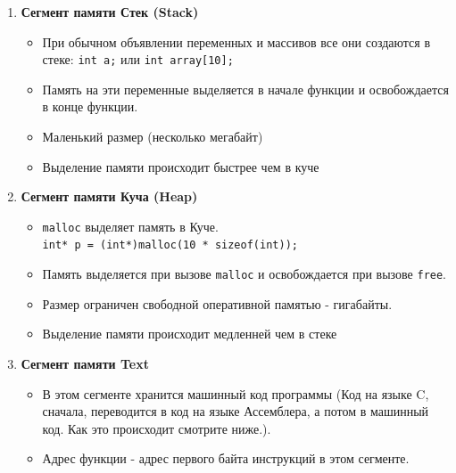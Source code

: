 \documentclass{article}
\begin{document}
\begin{multicols}{2}
\begin{center}
\end{center}
\columnbreak
\begin{enumerate}
\item \textbf{Сегмент памяти Стек (Stack)} \\
\begin{itemize}
\item При обычном объявлении переменных и массивов все они создаются в стеке: \texttt{int a;} или \texttt{int array[10];}
\item Память на эти переменные выделяется в начале функции и освобождается в конце функции.
\item Маленький размер (несколько мегабайт)
\item Выделение памяти происходит быстрее чем в куче
\end{itemize}
\item \textbf{Сегмент памяти Куча (Heap)} \\
\begin{itemize}
\item \texttt{malloc} выделяет память в Куче. \\
\texttt{int* p = (int*)malloc(10 * sizeof(int));}
\item Память выделяется при вызове \texttt{malloc} и освобождается при вызове \texttt{free}.
\item Размер ограничен свободной оперативной памятью - гигабайты.
\item Выделение памяти происходит медленней чем в стеке
\end{itemize}
\item \textbf{Сегмент памяти Text} \\
\begin{itemize}
\item В этом сегменте хранится машинный код программы (Код на языке C, сначала, переводится в код на языке Ассемблера, а потом в машинный код. Как это происходит смотрите ниже.).
\item Адрес функции - адрес первого байта инструкций в этом сегменте.
\end{itemize}
\end{enumerate}
\end{multicols}
\end{document}
